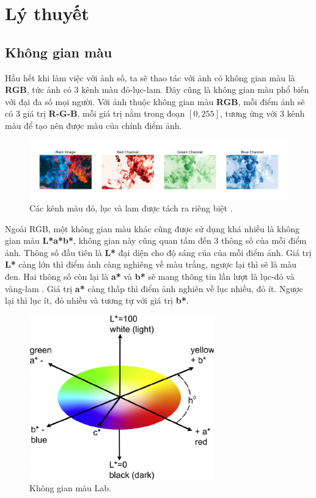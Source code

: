 \documentclass[a4paper, 12pt]{article}
\begin{document}
\section{Lý thuyết}

\subsection{Không gian màu}
Hầu hết khi làm việc với ảnh số, ta sẽ thao tác với ảnh có không gian màu là \textbf{RGB}, tức ảnh có 3 kênh màu đỏ-lục-lam. Đây cũng là không gian màu phổ biến với đại đa số mọi người. Với ảnh thuộc không gian màu \textbf{RGB}, mỗi điểm ảnh sẽ có 3 giá trị \textbf{R-G-B}, mỗi giá trị nằm trong đoạn $[0, 255]$, tương ứng với 3 kênh màu để tạo nên được màu của chính điểm ảnh.

\begin{figure}[!h]
\captionsetup{width=0.8\textwidth}
\centering
\includegraphics[width=16cm]{images/2_1.jpeg}
\caption{Các kênh màu đỏ, lục và lam được tách ra riêng biệt \cite{moeincolorization2020}.}
\label{fig:inspectrgb}
\end{figure}

\noindent
Ngoài RGB, một không gian màu khác cũng được sử dụng khá nhiều là không gian màu \textbf{L*a*b*}, không gian này cũng quan tấm đến 3 thông số của mỗi điểm ảnh. Thông số đầu tiên là \textbf{L*} đại diện cho độ sáng của của mỗi điểm ảnh. Giá trị \textbf{L*} càng lớn thì điểm ảnh càng nghiêng về màu trắng, ngược lại thì sẽ là màu đen. Hai thông số còn lại là \textbf{a*} và \textbf{b*} sẽ mang thông tin lần lượt là lục-đỏ và vàng-lam . Giá trị \textbf{a*} càng thấp thì điểm ảnh nghiên về lục nhiều, đỏ ít. Ngược lại thì lục ít, đỏ nhiều và tương tự với giá trị \textbf{b*}.

\begin{figure}[!h]
\captionsetup{width=0.8\textwidth}
\centering
\includegraphics[width=8cm]{images/2_2.png}
\caption{Không gian màu Lab.}
\label{fig:labspace}
\end{figure}
\end{document}
